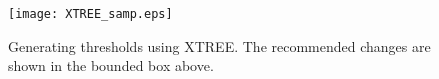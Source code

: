\begin{figure}
\texttt{[image: XTREE\_samp.eps]}
\caption{Generating thresholds using XTREE. The recommended changes are shown 
in the bounded box above.}
\label{fig:xtree}
\end{figure}